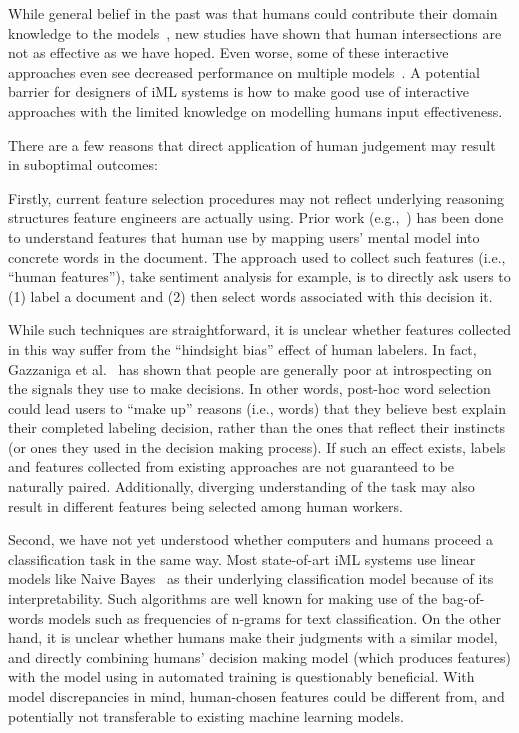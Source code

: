 \documentclass[chi_draft]{sigchi}
\begin{document}
While general belief in the past was that humans could contribute their domain knowledge to the models~\cite{stumpf2009interacting}, new studies have shown that human intersections are not as effective as we have hoped. Even worse, some of these interactive approaches even see decreased performance on multiple models~\cite{fiebrink2011human,stumpf2009interacting}.
A potential barrier for designers of iML systems is how to make good use of interactive approaches with the limited knowledge on modelling humans input effectiveness.

There are a few reasons that direct application of human judgement may result in suboptimal outcomes: 

Firstly, current feature selection procedures may not reflect underlying reasoning structures feature engineers are actually using.
Prior work (e.g.,~\cite{trivedi2015interactive}) has been done to understand features that human use by mapping users' mental model into concrete words in the document. The approach used to collect such features (i.e., ``human features''), take sentiment analysis for example, is to directly ask users to (1) label a document and (2) then select words associated with this decision it. 

While such techniques are straightforward, it is unclear whether features collected in this way suffer from the ``hindsight bias'' effect of human labelers. 
In fact, Gazzaniga et al.~\cite{gazzaniga2013integrated} has shown that people are generally poor at introspecting on the signals they use to make decisions. In other words, post-hoc word selection could lead users to ``make up'' reasons (i.e., words) that they believe best explain their completed labeling decision, rather than the ones that reflect their instincts (or ones they used in the decision making process). If such an effect exists, labels and features collected from existing approaches are not guaranteed to be naturally paired. Additionally, diverging understanding of the task may also result in different features being selected among human workers.

Second, we have not yet understood whether computers and humans proceed a classification task in the same way. Most state-of-art iML systems use linear models like Naive Bayes~\cite{kulesza2015principles, kulesza2011oriented, amershi2012regroup} as their underlying classification model because of its interpretability.
Such algorithms are well known for making use of the bag-of-words models such as frequencies of n-grams for text classification. On the other hand, it is unclear whether humans make their judgments with a similar model, and directly combining humans' decision making model (which produces features) with the model using in automated training is questionably beneficial. With model discrepancies in mind, human-chosen features could be different from, and potentially not transferable to existing machine learning models.
\end{document}
